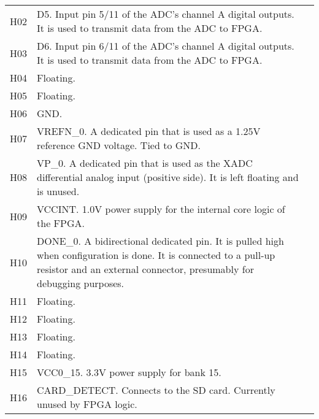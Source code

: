 \begin{tabularx}{\textwidth}{c X>{\raggedright\arraybackslash}X}
        H02 & D5. Input pin 5/11 of the ADC's channel A digital outputs. It is used to transmit data from
        the ADC to FPGA. \\
        H03 & D6. Input pin 6/11 of the ADC's channel A digital outputs. It is used to transmit data from
        the ADC to FPGA. \\
        H04 & Floating. \\
        H05 & Floating. \\
        H06 & GND. \\
        H07 & VREFN\_0. A dedicated pin that is used as a 1.25V reference GND voltage. Tied to GND. \\
        H08 & VP\_0. A dedicated pin that is used as the XADC differential analog input (positive side). It
        is left floating and is unused. \\
        H09 & VCCINT. 1.0V power supply for the internal core logic of the FPGA. \\
        H10 & DONE\_0. A bidirectional dedicated pin. It is pulled high when configuration is done. It
        is connected to a pull-up resistor and an external connector, presumably for debugging purposes. \\
        H11 & Floating. \\
        H12 & Floating. \\
        H13 & Floating. \\
        H14 & Floating. \\
        H15 & VCC0\_15. 3.3V power supply for bank 15. \\
        H16 & CARD\_DETECT. Connects to the SD card. Currently unused by FPGA logic. \\

        \midrule


\end{tabularx}
